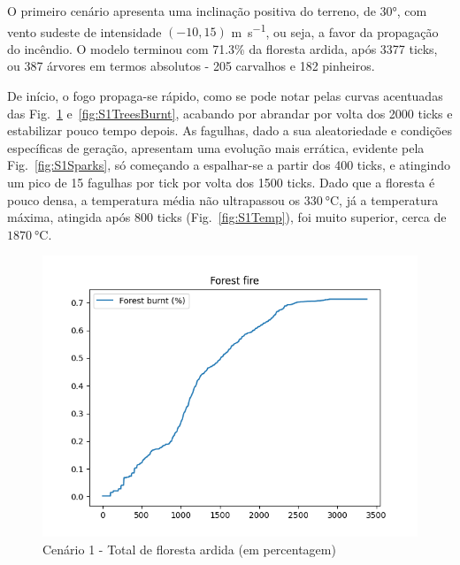 O primeiro cenário apresenta uma inclinação positiva do terreno, de \ang{30}, com vento sudeste de intensidade $(-10, 15)$ \si{\meter\per\second}, ou seja, a favor da propagação do incêndio.
O modelo terminou com 71.3\% da floresta ardida, após 3377 ticks, ou 387 árvores em termos absolutos - 205 carvalhos e 182 pinheiros.

De início, o fogo propaga-se rápido, como se pode notar pelas curvas acentuadas das Fig.~\ref{fig:S1ForestBurnt} e~\ref{fig:S1TreesBurnt}, acabando por abrandar por volta dos 2000 ticks e estabilizar pouco tempo depois.
As fagulhas, dado a sua aleatoriedade e condições específicas de geração, apresentam uma evolução mais errática, evidente pela Fig.~\ref{fig:S1Sparks}, só começando a espalhar-se a partir dos 400 ticks, e atingindo um pico de 15 fagulhas por tick por volta dos 1500 ticks.
Dado que a floresta é pouco densa, a temperatura média não ultrapassou os $\SI{330}{\degreeCelsius}$, já a temperatura máxima, atingida após 800 ticks (Fig.~\ref{fig:S1Temp}), foi muito superior, cerca de $\SI{1870}{\degreeCelsius}$.

\begin{figure}[H]
    \includegraphics[width=\linewidth]{../src/runs/scenario1/forest_fire}
    \caption{Cenário 1 - Total de floresta ardida (em percentagem)}
    \label{fig:S1ForestBurnt}
\end{figure}

